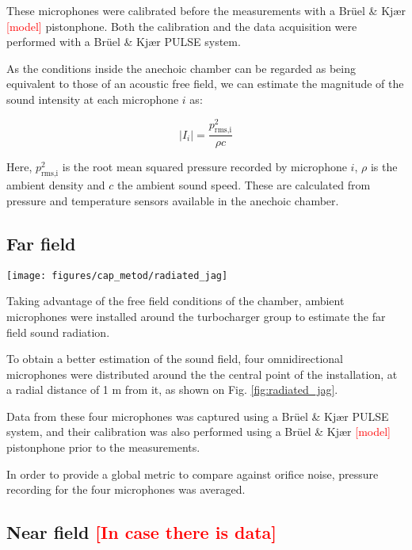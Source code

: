 These microphones were calibrated before the measurements with a Brüel \& Kjær \textcolor{red}{[model]} pistonphone. Both the calibration and the data acquisition were performed with a Brüel \& Kjær PULSE system.

As the conditions inside the anechoic chamber can be regarded as being equivalent to those of an acoustic free field, we can estimate the magnitude of the sound intensity at each microphone $i$ as:

\begin{equation}
	|I_i| = \frac{p^2_\text{rms,i}}{\rho c}
\end{equation}

Here, $p^2_\text{rms,i}$ is the root mean squared pressure recorded by microphone $i$, $\rho$ is the ambient density and $c$ the ambient sound speed. These are calculated from pressure and temperature sensors available in the anechoic chamber.

\subsection{Far field}
\label{sub:metod_far_field}

\begin{figure*}[b!]
\centering
\texttt{[image: figures/cap\_metod/radiated\_jag]}
\caption{Radiated noise microphones installed around a commercial set of compressor inlet and outlet pipes.}
\label{fig:radiated_jag}
\end{figure*}

Taking advantage of the free field conditions of the chamber, ambient microphones were installed around the turbocharger group to estimate the far field sound radiation.

To obtain a better estimation of the sound field, four omnidirectional microphones were distributed around the the central point of the installation, at a radial distance of 1 m from it, as shown on Fig. \ref{fig:radiated_jag}.

Data from these four microphones was captured using a Brüel \& Kjær PULSE system, and their calibration was also performed using a Brüel \& Kjær \textcolor{red}{[model]} pistonphone prior to the measurements.

In order to provide a global metric to compare against orifice noise, pressure recording for the four microphones was averaged.


\subsection{Near field \textcolor{red}{[In case there is data]}}

